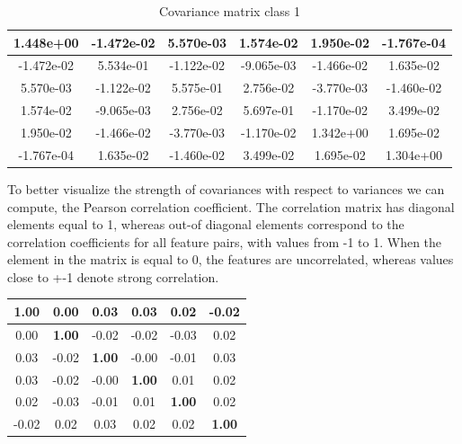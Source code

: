 \documentclass[12pt, a4paper]{article}
\begin{document}
\begin{table}[ht!]
	\centering
    \begin{tabular}{| | c c c c c c | |} 
 		\hline
    	1.448e+00 & -1.472e-02 & 5.570e-03 & 1.574e-02 & 1.950e-02 & -1.767e-04\\
 		\hline
    	-1.472e-02 & 5.534e-01 & -1.122e-02 & -9.065e-03 & -1.466e-02 & 1.635e-02\\
 		\hline
    	5.570e-03 & -1.122e-02 & 5.575e-01 & 2.756e-02 & -3.770e-03 & -1.460e-02\\
 		\hline
    	1.574e-02 & -9.065e-03 & 2.756e-02 & 5.697e-01 & -1.170e-02 & 3.499e-02\\
 		\hline
    	1.950e-02 & -1.466e-02 & -3.770e-03 & -1.170e-02 & 1.342e+00 & 1.695e-02\\
 		\hline
    	-1.767e-04 & 1.635e-02 & -1.460e-02 & 3.499e-02 & 1.695e-02 & 1.304e+00\\
 		\hline
 	\end{tabular}
    \caption{Covariance matrix class 1}
\end{table}

To better visualize the strength of covariances with respect to variances we can compute, the Pearson correlation coefficient. The correlation matrix has diagonal elements equal to 1, whereas out-of diagonal elements correspond to the correlation coefficients for all feature pairs, with values from -1 to 1. When the element in the matrix is equal to 0, the features are uncorrelated, whereas values close to +-1 denote strong correlation.

\begin{table}[ht!]
	\centering
    \begin{tabular}{| | c c c c c c | |} 
 		\hline
 		\textbf{1.00} & 0.00 & 0.03 & 0.03 & 0.02 & -0.02 \\ 
 		\hline
 		0.00 & \textbf{1.00} & -0.02 & -0.02 & -0.03 & 0.02 \\
 		\hline
 		0.03 & -0.02 & \textbf{1.00} & -0.00 & -0.01 & 0.03 \\
 		\hline
 		0.03 & -0.02 & -0.00 & \textbf{1.00} & 0.01 & 0.02 \\
 		\hline
 		0.02 & -0.03 & -0.01 & 0.01 & \textbf{1.00} & 0.02 \\
 		\hline
 		-0.02 & 0.02 & 0.03 & 0.02 & 0.02 & \textbf{1.00} \\
 		\hline
 	\end{tabular}
\end{table}
\end{document}
